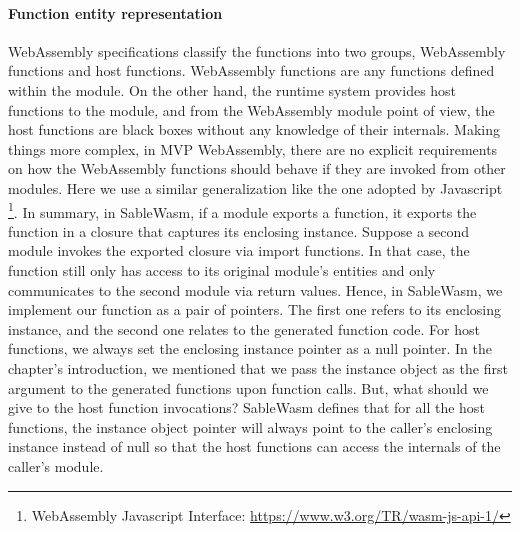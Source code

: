\paragraph{Function entity representation}
WebAssembly specifications classify the functions into two groups, WebAssembly functions and host functions. WebAssembly functions are any functions defined within the module. On the other hand, the runtime system provides host functions to the module, and from the WebAssembly module point of view, the host functions are black boxes without any knowledge of their internals. Making things more complex, in MVP WebAssembly, there are no explicit requirements on how the WebAssembly functions should behave if they are invoked from other modules. Here we use a similar generalization like the one adopted by Javascript \footnote{WebAssembly Javascript Interface: \url{https://www.w3.org/TR/wasm-js-api-1/}}. In summary, in SableWasm, if a module exports a function, it exports the function in a closure that captures its enclosing instance. Suppose a second module invokes the exported closure via import functions. In that case, the function still only has access to its original module's entities and only communicates to the second module via return values. Hence, in SableWasm, we implement our function as a pair of pointers. The first one refers to its enclosing instance, and the second one relates to the generated function code. For host functions, we always set the enclosing instance pointer as a null pointer. In the chapter's introduction, we mentioned that we pass the instance object as the first argument to the generated functions upon function calls. But, what should we give to the host function invocations? SableWasm defines that for all the host functions, the instance object pointer will always point to the caller's enclosing instance instead of null so that the host functions can access the internals of the caller's module.

